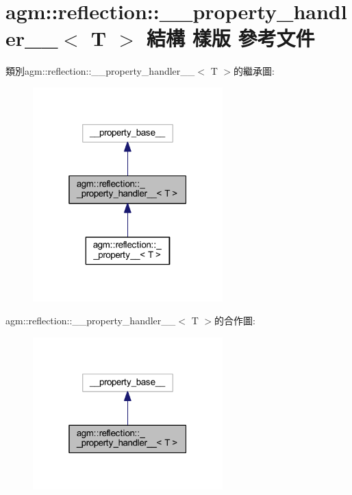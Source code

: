 \hypertarget{structagm_1_1reflection_1_1____property__handler____}{}\section{agm\+:\+:reflection\+:\+:\+\_\+\+\_\+property\+\_\+handler\+\_\+\+\_\+$<$ T $>$ 結構 樣版 參考文件}
\label{structagm_1_1reflection_1_1____property__handler____}


類別agm\+:\+:reflection\+:\+:\+\_\+\+\_\+property\+\_\+handler\+\_\+\+\_\+$<$ T $>$的繼承圖\+:\nopagebreak
\begin{figure}[H]
\begin{center}
\leavevmode
\includegraphics[width=208pt]{structagm_1_1reflection_1_1____property__handler______inherit__graph}
\end{center}
\end{figure}


agm\+:\+:reflection\+:\+:\+\_\+\+\_\+property\+\_\+handler\+\_\+\+\_\+$<$ T $>$的合作圖\+:\nopagebreak
\begin{figure}[H]
\begin{center}
\leavevmode
\includegraphics[width=208pt]{structagm_1_1reflection_1_1____property__handler______coll__graph}
\end{center}
\end{figure}
